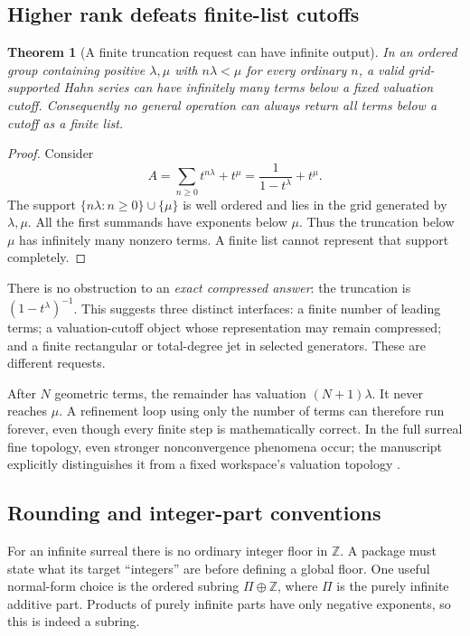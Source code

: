 \documentclass[11pt,letterpaper]{article}
\newtheorem{theorem}{Theorem}[section]
\theoremstyle{definition}
\newcommand{\Z}{\mathbb Z}
\numberwithin{equation}{section}
\begin{document}
\subsection{Higher rank defeats finite-list cutoffs}
\begin{theorem}[A finite truncation request can have infinite output]\label{thm:cutoff}
In an ordered group containing positive $\lambda,\mu$ with $n\lambda<\mu$ for every ordinary $n$, a valid grid-supported Hahn series can have infinitely many terms below a fixed valuation cutoff. Consequently no general operation can always return all terms below a cutoff as a finite list.
\end{theorem}
\begin{proof}
Consider
\[
 A=\sum_{n\ge0}t^{n\lambda}+t^\mu
   =\frac1{1-t^\lambda}+t^\mu.
\]
The support $\{n\lambda:n\ge0\}\cup\{\mu\}$ is well ordered and lies in the grid generated by $\lambda,\mu$. All the first summands have exponents below $\mu$. Thus the truncation below $\mu$ has infinitely many nonzero terms. A finite list cannot represent that support completely.
\end{proof}
There is no obstruction to an \emph{exact compressed answer}: the truncation is $(1-t^\lambda)^{-1}$. This suggests three distinct interfaces: a finite number of leading terms; a valuation-cutoff object whose representation may remain compressed; and a finite rectangular or total-degree jet in selected generators. These are different requests.

After $N$ geometric terms, the remainder has valuation $(N+1)\lambda$. It never reaches $\mu$. A refinement loop using only the number of terms can therefore run forever, even though every finite step is mathematically correct. In the full surreal fine topology, even stronger nonconvergence phenomena occur; the manuscript explicitly distinguishes it from a fixed workspace's valuation topology \cite{SourceAnalysis}.

\subsection{Rounding and integer-part conventions}
For an infinite surreal there is no ordinary integer floor in $\Z$. A package must state what its target ``integers'' are before defining a global floor. One useful normal-form choice is the ordered subring $\Pi\oplus\Z$, where $\Pi$ is the purely infinite additive part. Products of purely infinite parts have only negative exponents, so this is indeed a subring.
\end{document}
